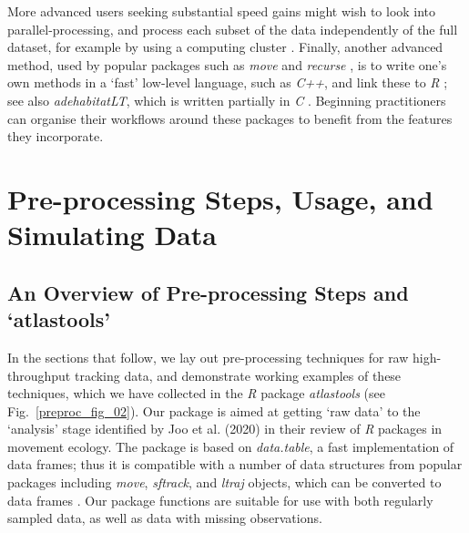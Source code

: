 More advanced users seeking substantial speed gains might wish to look into parallel-processing, and process each subset of the data independently of the full dataset, for example by using a computing cluster \citep[see also][for an alternative]{zjdai2021}.
Finally, another advanced method, used by popular packages such as \textit{move} \citep{kranstauber2011} and \textit{recurse} \citep{bracis2018}, is to write one's own methods in a `fast' low-level language, such as \textit{C++}, and link these to \textit{R} \citep[][]{eddelbuettel2013}; see also \textit{adehabitatLT}, which is written partially in \textit{C} \citep{calenge2006}.
Beginning practitioners can organise their workflows around these packages to benefit from the features they incorporate.

\section*{Pre-processing Steps, Usage, and Simulating Data}

\subsection*{An Overview of Pre-processing Steps and `atlastools'}

In the sections that follow, we lay out pre-processing techniques for raw high-throughput tracking data, and demonstrate working examples of these techniques, which we have collected in the \textit{R} package \textit{atlastools} (see Fig.~\ref{preproc_fig_02}).
Our package is aimed at getting `raw data' to the `analysis' stage identified by Joo et al. (2020) in their review of \textit{R} packages in movement ecology.
The package is based on \textit{data.table}, a fast implementation of data frames; thus it is compatible with a number of data structures from popular packages including \textit{move}, \textit{sftrack}, and \textit{ltraj} objects, which can be converted to data frames \citep[][]{kranstauber2011,boone2020,calenge2009}.
Our package functions are suitable for use with both regularly sampled data, as well as data with missing observations.

